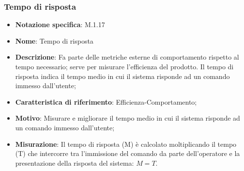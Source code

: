 \subsubsection{Tempo di risposta}
\begin{itemize}
    \item \textbf{Notazione specifica}: M.1.17
    \item \textbf{Nome}: Tempo di risposta
    \item \textbf{Descrizione}: Fa parte delle metriche esterne di comportamento rispetto al tempo necessario; serve per misurare l’efficienza del prodotto. Il tempo di risposta indica il tempo medio in cui il sistema risponde ad un comando immesso dall’utente;
    \item \textbf{Caratteristica di riferimento}: Efficienza-Comportamento;
    \item \textbf{Motivo}: Misurare e migliorare il tempo medio in cui il sistema risponde ad un comando immesso dall’utente;
    \item \textbf{Misurazione}: Il tempo di risposta (M) è calcolato moltiplicando il tempo (T) che intercorre tra l’immissione del comando da parte dell’operatore e la presentazione della risposta del sistema: \( M = T \).
\end{itemize}
